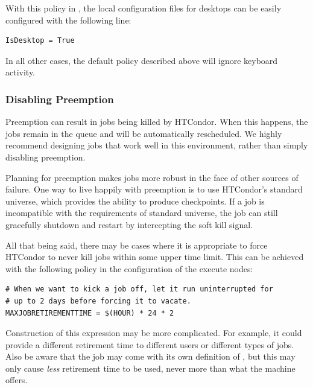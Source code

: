 With this policy in , the local configuration files for
desktops can be easily configured with the following line:

\begin{verbatim}
IsDesktop = True
\end{verbatim}

In all other cases, the default policy described above will ignore
keyboard activity.

\subsubsection{\label{sec:Disabling Preemption}
Disabling Preemption}

Preemption can result in jobs being killed by HTCondor.  When this
happens, the jobs remain in the queue and will be automatically
rescheduled.  We highly recommend designing jobs that work well in
this environment, rather than simply disabling preemption.

Planning for preemption makes jobs more robust in the face of other
sources of failure.  One way to live happily with preemption is to use
HTCondor's standard universe, which provides the ability to produce
checkpoints.
If a job is incompatible with the requirements of standard universe,
the job can still gracefully shutdown and restart by intercepting the soft
kill signal.

All that being said, there may be cases where it is appropriate
to force 
HTCondor to never kill jobs within some upper time limit.
This can be achieved with the following policy in the configuration of
the execute nodes:

\footnotesize
\begin{verbatim}
# When we want to kick a job off, let it run uninterrupted for
# up to 2 days before forcing it to vacate.
MAXJOBRETIREMENTTIME = $(HOUR) * 24 * 2
\end{verbatim}
\normalsize

Construction of this expression may be more complicated.
For example, it could provide
a different retirement time to different users or different types of
jobs.  Also be aware that the job may come with its own definition
of , but this may only cause \emph{less}
retirement time to be used, never more than what the machine offers.

